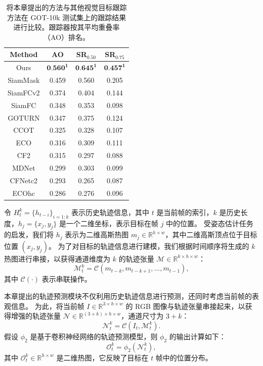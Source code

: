 \begin{table}[t]
\centering
\caption{将本章提出的方法与其他视觉目标跟踪方法在 GOT-10k 测试集上的跟踪结果进行比较。跟踪器按其平均重叠率（AO）排名。}
\begin{tabular}{cccc}
\bottomrule
Method   &  AO   &  SR$_{0.50}$ & SR$_{0.75}$  \\
\hline
Ours &  $\textbf{0.560}^\textbf{1}$ & $\textbf{0.645}^\textbf{1}$  & $\textbf{0.457}^\textbf{1}$  \\
SiamMask &  0.459&  0.560 &0.205 \\
SiamFCv2 &  0.374&  0.404 &0.144 \\
SiamFC   &  0.348&  0.353 &0.098 \\
GOTURN	 &  0.347&  0.375 &0.124 \\
CCOT	 &  0.325&  0.328 &0.107 \\
ECO	     &  0.316&  0.309 &0.111 \\
CF2	     &  0.315&  0.297 &0.088 \\
MDNet	 &  0.299&  0.303 &0.099 \\
CFNetc2	 &  0.293&  0.265 &0.087 \\
ECOhc	 &  0.286&  0.276 &0.096 \\
\bottomrule
\end{tabular}
\label{table:got}
\end{table}

令 $H_{t}^{k} = \{h_{t-i}\}_{i=1:k}$ 表示历史轨迹信息，其中 $t$ 是当前帧的索引，$k$ 是历史长度，$h_{j} = \{x_{j}, y_{j}\}$ 是一个二维坐标，表示目标在帧 $j$ 中的位置。
受姿态估计任务的启发，我们将 $h_{j}$ 表示为二维高斯热图 $m_{j} \in \mathbb R^{h \times w}$，其中二维高斯顶点位于目标位置 $(x_{j}, y_{j})$。
为了对目标的轨迹信息进行建模，我们根据时间顺序将生成的 $k$ 热图进行串接，以获得通道维度为 $k$ 的轨迹张量 $\mathcal{M} \in \mathbb{R}^{k \times h \times w}$：
\begin{equation}
    \mathcal{M}_{t}^{k} = \mathcal{C}(m_{t-k}, m_{t-k+1}, ..., m_{t-1}),
\end{equation}
其中 $\mathcal{C}(\cdot)$ 表示串联操作。

本章提出的轨迹预测模块不仅利用历史轨迹信息进行预测，还同时考虑当前帧的表观信息。
为此，将当前帧 $I \in \mathbb{R}^{3 \times h \times w}$ 的 RGB 图像与轨迹张量串接起来，以获得增强的轨迹张量 $\mathcal{N} \in \mathbb{R}^{(3+k) \times h \times w}$，通道尺寸为 $3+k$：
\begin{equation}
    \mathcal{N}_{t}^{k} = \mathcal{C}(I_{t}, \mathcal{M}_{t}^{k}).
\end{equation}
假设 $\phi_{2}$ 是基于卷积神经网络的轨迹预测模型，则 $\phi_{2}$ 的输出计算如下：
\begin{equation}
    \mathcal{O}_{t}^{k} = \phi_{2}(\mathcal{N}_{t}^{k}),
\end{equation}
其中 $\mathcal{O}_{t}^{k} \in \mathbb{R}^{h \times w}$ 是二维热图，它反映了目标在 $t$ 帧中的位置分布。

